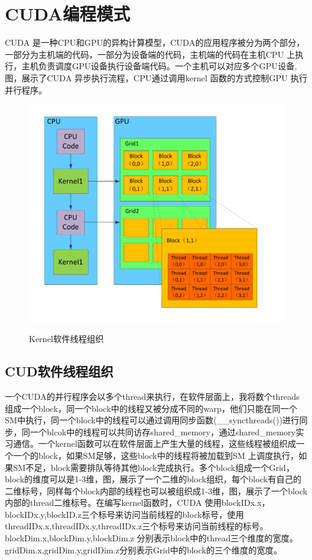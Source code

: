 \section{CUDA编程模式}
CUDA 是一种CPU和GPU的异构计算模型，CUDA的应用程序被分为两个部分，一部分为主机端的代码，一部分为设备端的代码，主机端的代码在主机CPU 上执行，主机负责调度GPU设备执行设备端代码。一个主机可以对应多个GPU设备,图，展示了CUDA 异步执行流程，CPU通过调用kernel 函数的方式控制GPU 执行并行程序。\newline
\begin{figure}
\setlength{\belowcaptionskip}{-0.5cm}
  \begin{center}
    {\includegraphics[width=1 \textwidth]{figures/block.pdf}}
    \end{center}
  \caption{{\footnotesize{Kernel软件线程组织}}}
  \label{ktz}
\end{figure}
\subsection{CUD软件线程组织}
一个CUDA的并行程序会以多个thread来执行，在软件层面上，我将数个threads组成一个block，同一个block中的线程又被分成不同的warp，他们只能在同一个SM中执行，同一个block中的线程可以通过调用同步函数(\_\_syncthreads())进行同步，同一个blcok中的线程可以共同访存shared\_memory，通过shared\_memory实习通信。一个kernel函数可以在软件层面上产生大量的线程，这些线程被组织成一个一个的block，如果SM足够，这些block中的线程将被加载到SM 上调度执行，如果SM不足，block需要排队等待其他block完成执行。多个block组成一个Grid，block的维度可以是1-3维，图，展示了一个二维的block组织，每个block有自己的二维标号，同样每个block内部的线程也可以被组织成1-3维，图，展示了一个block内部的thread二维标号。在编写kernel函数时，CUDA 使用blockIDx.x，blockIDx.y,blockID.z三个标号来访问当前线程的block标号，使用threadIDx.x,threadIDx.y,threadIDx.z三个标号来访问当前线程的标号。blockDim.x,blockDim.y,blockDim.z 分别表示block中的thread三个维度的宽度。gridDim.x,gridDim.y,gridDim.z分别表示Grid中的block的三个维度的宽度。\newline
